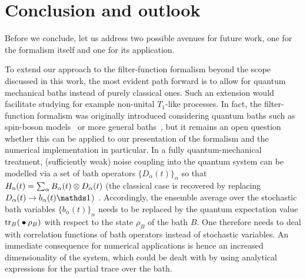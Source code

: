 \chapter{Conclusion and outlook}\label{ch:ff:conclusion}
Before we conclude, let us address two possible avenues for future work, one for the formalism itself and one for its application.

To extend our approach to the filter-function formalism beyond the scope discussed in this work, the most evident path forward is to allow for quantum mechanical baths instead of purely classical ones.
Such an extension would facilitate studying for example non-unital $T_1$-like processes.
In fact, the filter-function formalism was originally introduced considering quantum baths such as spin-boson models~\cite{Martinis2003,Uhrig2007} or more general baths~\cite{Kofman2001,Yuge2011,Paz-Silva2017}, but it remains an open question whether this can be applied to our presentation of the formalism and the numerical implementation in particular.
In a fully quantum-mechanical treatment, (sufficiently weak) noise coupling into the quantum system can be modelled via a set of bath operators $\{D_\alpha(t)\}_\alpha$ so that $H_{\mathrm{n}}(t) = \sum_\alpha B_\alpha(t)\otimes D_\alpha(t)$ (the classical case is recovered by replacing $D_\alpha(t)\rightarrow b_\alpha(t)\eye$)~\cite{Breuer2007}.
Accordingly, the ensemble average over the stochastic bath variables $\{b_\alpha(t)\}_\alpha$ needs to be replaced by the quantum expectation value $\tr_B(\:\bullet\:\rho_B)$ with respect to the state $\rho_B$ of the bath $B$.
One therefore needs to deal with correlation functions of bath operators instead of stochastic variables.
An immediate consequence for numerical applications is hence an increased dimensionality of the system, which could be dealt with by using analytical expressions for the partial trace over the bath.

